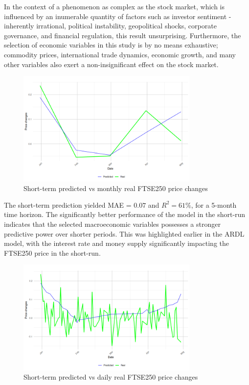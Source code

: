 \documentclass[11pt,a4paper]{article}
\begin{document}
In the context of a phenomenon as complex as the stock market,
which is influenced by an inumerable quantity of factors such as investor sentiment
- inherently irrational, 
political instability, geopolitical shocks, corporate governance, and financial regulation, this result 
unsurprising. Furthermore, the selection of economic variables in this study
is by no means exhaustive; commodity prices, international trade dynamics,
economic growth, and many other variables also exert a non-insignificant 
effect on the stock market.

\begin{figure}[h]
    \centering
    \includegraphics[width=0.8\textwidth]{short-term-monthly.png}
    \caption{Short-term predicted vs monthly real FTSE250 price changes}
    \label{fig:smonthly}
\end{figure}

The short-term prediction yielded MAE = $0.07$ and 
$R^2 = 61\%$, for a 5-month time horizon.
The significantly better performance of the model in the short-run
indicates that the selected macroeconomic variables possesses
a stronger predictive power over shorter periods. This was highlighted 
earlier in the ARDL model, with the interest rate and money supply significantly
impacting the FTSE250 price in the short-run. 

\begin{figure}[h]
    \centering
    \includegraphics[width=0.8\textwidth]{short-term-daily.png}
    \caption{Short-term predicted vs daily real FTSE250 price changes}
    \label{fig:sdaily}
\end{figure}
\end{document}
